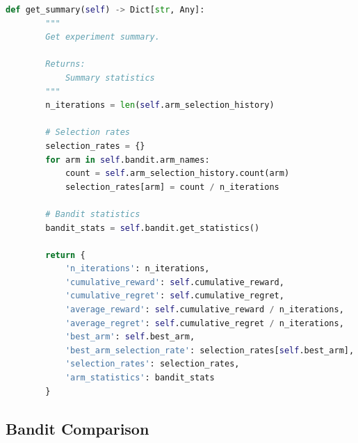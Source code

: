 \begin{lstlisting}[language=Python, caption={Multi-Armed Bandit Implementation}]
    def get_summary(self) -> Dict[str, Any]:
        """
        Get experiment summary.

        Returns:
            Summary statistics
        """
        n_iterations = len(self.arm_selection_history)

        # Selection rates
        selection_rates = {}
        for arm in self.bandit.arm_names:
            count = self.arm_selection_history.count(arm)
            selection_rates[arm] = count / n_iterations

        # Bandit statistics
        bandit_stats = self.bandit.get_statistics()

        return {
            'n_iterations': n_iterations,
            'cumulative_reward': self.cumulative_reward,
            'cumulative_regret': self.cumulative_regret,
            'average_reward': self.cumulative_reward / n_iterations,
            'average_regret': self.cumulative_regret / n_iterations,
            'best_arm': self.best_arm,
            'best_arm_selection_rate': selection_rates[self.best_arm],
            'selection_rates': selection_rates,
            'arm_statistics': bandit_stats
        }
\end{lstlisting}

\subsection{Bandit Comparison}

